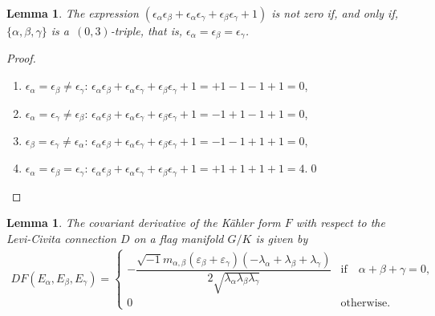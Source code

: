 \documentclass[pdftex]{sigma}%
\numberwithin{equation}{section}
\newtheorem{Lemma}[Theorem]{Lemma}
\begin{document}
\begin{Lemma}
The expression $(\epsilon_{\alpha}\epsilon_{\beta}+\epsilon_{\alpha}\epsilon_{\gamma}+\epsilon_{\beta}\epsilon_{\gamma}+1)$ is not zero if, and only if, $\{\alpha, \beta, \gamma\}$ is a~$(0,3)$-triple, that is, $\epsilon_{\alpha}=\epsilon_{\beta}=\epsilon_{\gamma}$.
\end{Lemma}
\begin{proof}\quad
\begin{enumerate}\itemsep=0pt
\item[$(i)$]
$\epsilon_{\alpha}=\epsilon_{\beta}\neq \epsilon_{\gamma}$:\quad
$\epsilon_{\alpha}\epsilon_{\beta}+\epsilon_{\alpha}\epsilon_{\gamma} +\epsilon_{\beta}\epsilon_{\gamma}+1=+1-1-1+1=0$,

\item[$(ii)$] $\epsilon_{\alpha}=\epsilon_{\gamma}\neq \epsilon_{\beta}$:\quad
$\epsilon_{\alpha}\epsilon_{\beta}+\epsilon_{\alpha}\epsilon_{\gamma} +\epsilon_{\beta}\epsilon_{\gamma}+1=-1+1-1+1=0$,

\item[$(iii)$] $\epsilon_{\beta}=\epsilon_{\gamma}\neq \epsilon_{\alpha}$:\quad
$\epsilon_{\alpha}\epsilon_{\beta}+\epsilon_{\alpha}\epsilon_{\gamma} +\epsilon_{\beta}\epsilon_{\gamma}+1=-1-1+1+1=0$,

\item[$(iv)$] $\epsilon_{\alpha}=\epsilon_{\beta}=\epsilon_{\gamma}$:\quad
$\epsilon_{\alpha}\epsilon_{\beta}+\epsilon_{\alpha}\epsilon_{\gamma} +\epsilon_{\beta}\epsilon_{\gamma}+1=+1+1+1+1=4$.\hfill \qed
\end{enumerate}\renewcommand{\qed}{}
\end{proof}

\begin{Lemma}
The covariant derivative of the K\"ahler form $F$ with respect to the Levi-Civita connection $D$ on a flag manifold $G/K$ is given by
\begin{gather*}
DF(E_{\alpha},E_{\beta},E_{\gamma})=
\begin{cases}
-\dfrac{\sqrt{-1}m_{\alpha,\beta}(\varepsilon_{\beta}+\varepsilon_{\gamma})(-\lambda_{\alpha} +\lambda_{\beta}+\lambda_{\gamma})}{2\sqrt{\lambda_{\alpha}\lambda_{\beta}\lambda_{\gamma}}}
&\text{if}\quad \alpha+\beta+\gamma = 0,
\\
0 &\text{otherwise}.
\end{cases}
\end{gather*}
\end{Lemma}
\end{document}
